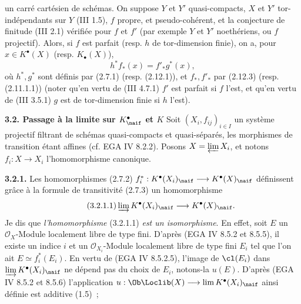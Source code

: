 un
carré cartésien de schémas. On suppose \(Y\) et \(Y'\) quasi-compacts, \(X\) et \(Y'\) tor-indépendants sur \(Y\) (III 1.5), \(f\) propre, et pseudo-cohérent, et la conjecture de finitude (III 2.1) vérifiée pour \(f\) et \(f'\) (par exemple \(Y\) et \(Y'\) noethériens, ou \(f\) projectif). Alors, si \(f\) est parfait (resp. \(h\) de tor-dimension finie), on a, pour \(x\in K^{\bullet}(X)\) (resp. \(K_{\bullet}(X)\)),
\[
 h^* f_*(x)=f'_* g^*(x),
\]
où \(h^*,g^*\) sont définis par (2.7.1) (resp. (2.12.1)), et \(f_*,f'_*\) par (2.12.3) (resp. (2.11.1.1)) (noter qu'en vertu de (III 4.7.1) \(f'\) est parfait si \(f\) l'est, et qu'en vertu de (III 3.5.1) \(g\) est de tor-dimension finie si \(h\) l'est).

\textbf{3.2. Passage à la limite sur \(K^{\bullet}_{\naif}\) et \(K\)} Soit \((X_i,f_{ij})_{i\in I}\) un système projectif filtrant de schémas quasi-compacts et quasi-séparés, les morphismes de transition étant affines (cf. EGA IV 8.2.2). Posons \(X=\varprojlim X_i\), et notons \(f_i:X\to X_i\) l'homomorphisme canonique.

\textbf{3.2.1.} Les homomorphismes (2.7.2) \(f_i^*:K^{\bullet}(X_i)_{\naif}\longrightarrow K^{\bullet}(X)_{\naif}\) définissent grâce à la formule de transitivité (2.7.3) un homomorphisme
\begin{equation}\tag{3.2.1.1}
 \varinjlim K^{\bullet}(X_i)_{\naif}\longrightarrow K^{\bullet}(X)_{\naif}.
\end{equation}
Je dis que \emph{l'homomorphisme} (3.2.1.1) \emph{est un isomorphisme}. En effet, soit \(E\) un \(\mathcal O_X\)-Module localement libre de type fini. D'après (EGA IV 8.5.2 et 8.5.5), il existe un indice \(i\) et un \(\mathcal O_{X_i}\)-Module localement libre de type fini \(E_i\) tel que l'on ait \(E\simeq f_i^*(E_i)\). En vertu de (EGA IV 8.5.2.5), l'image de \(\cl(E_i)\) dans \(\varinjlim K^{\bullet}(X_i)_{\naif}\) ne dépend pas du choix de \(E_i\), notons-la \(u(E)\). D'après (EGA IV 8.5.2 et 8.5.6) l'application
\(u:\Ob\Loclib(X)\longrightarrow \lim K^{\bullet}(X_i)_{\naif}\) ainsi définie est additive (1.5)~;
